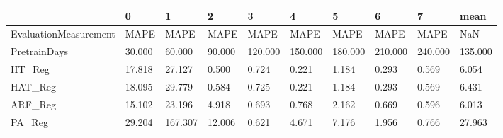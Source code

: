 \begin{tabular}{llllllllll}
\toprule
{} &      0 &       1 &      2 &       3 &       4 &       5 &       6 &       7 &    mean \\
\midrule
EvaluationMeasurement &   MAPE &    MAPE &   MAPE &    MAPE &    MAPE &    MAPE &    MAPE &    MAPE &     NaN \\
PretrainDays          & 30.000 &  60.000 & 90.000 & 120.000 & 150.000 & 180.000 & 210.000 & 240.000 & 135.000 \\
HT\_Reg                & 17.818 &  27.127 &  0.500 &   0.724 &   0.221 &   1.184 &   0.293 &   0.569 &   6.054 \\
HAT\_Reg               & 18.095 &  29.779 &  0.584 &   0.725 &   0.221 &   1.184 &   0.293 &   0.569 &   6.431 \\
ARF\_Reg               & 15.102 &  23.196 &  4.918 &   0.693 &   0.768 &   2.162 &   0.669 &   0.596 &   6.013 \\
PA\_Reg                & 29.204 & 167.307 & 12.006 &   0.621 &   4.671 &   7.176 &   1.956 &   0.766 &  27.963 \\
\bottomrule
\end{tabular}
